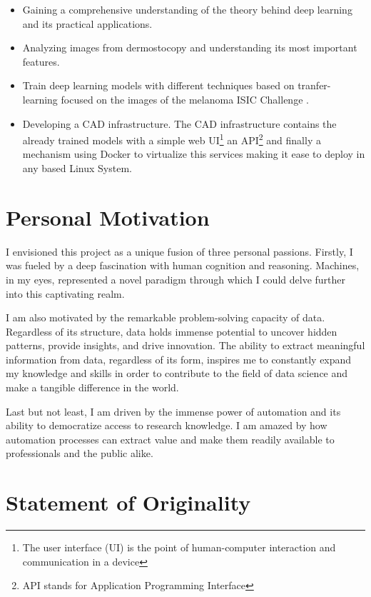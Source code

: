 \begin{itemize}
  \item Gaining a comprehensive understanding of the theory behind deep learning and its practical applications.
  \item Analyzing images from dermostocopy and understanding its most important features.
  \item Train deep learning models with different techniques based on tranfer-learning focused on the images of the melanoma ISIC Challenge \cite{IsicChallenge}.
  \item Developing a CAD infrastructure. The CAD infrastructure contains the already trained models with a simple web UI\footnote{The user interface (UI) is the point of human-computer interaction and communication in a device} an API\footnote{API stands for Application Programming Interface} and finally a mechanism using Docker to virtualize this services making it ease to deploy in any based Linux System.
\end{itemize}

\section{Personal Motivation}

I envisioned this project as a unique fusion of three personal passions.
Firstly, I was fueled by a deep fascination with human cognition and reasoning.
Machines, in my eyes, represented a novel paradigm through which I could delve
further into this captivating realm. \newline

I am also motivated by the remarkable problem-solving capacity of data.
Regardless of its structure, data holds immense potential to uncover hidden
patterns, provide insights, and drive innovation. The ability to extract
meaningful information from data, regardless of its form, inspires me to
constantly expand my knowledge and skills in order to contribute to the field
of data science and make a tangible difference in the world. \newline

Last but not least, I am driven by the immense power of automation and its
ability to democratize access to research knowledge. I am amazed by how
automation processes can extract value and make them readily available to
professionals and the public alike.

\section{Statement of Originality}

